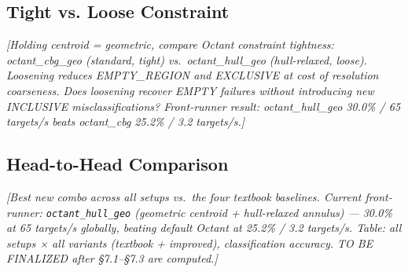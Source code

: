 \subsection{Tight vs. Loose Constraint}
\label{sec:improved-constraint}
\textit{[Holding centroid = geometric, compare Octant constraint tightness:
octant\_cbg\_geo (standard, tight) vs.\ octant\_hull\_geo (hull-relaxed, loose).
Loosening reduces EMPTY\_REGION and EXCLUSIVE at cost of resolution coarseness.
Does loosening recover EMPTY failures without introducing new INCLUSIVE misclassifications?
Front-runner result: octant\_hull\_geo 30.0\% / 65 targets/s beats octant\_cbg 25.2\% / 3.2 targets/s.]}

\subsection{Head-to-Head Comparison}
\label{sec:improved-head2head}
\textit{[Best new combo across all setups vs.\ the four textbook baselines.
Current front-runner: \texttt{octant\_hull\_geo} (geometric centroid + hull-relaxed annulus) —
30.0\% at 65 targets/s globally, beating default Octant at 25.2\% / 3.2 targets/s.
Table: all setups × all variants (textbook + improved), classification accuracy.
TO BE FINALIZED after §7.1--§7.3 are computed.]}
